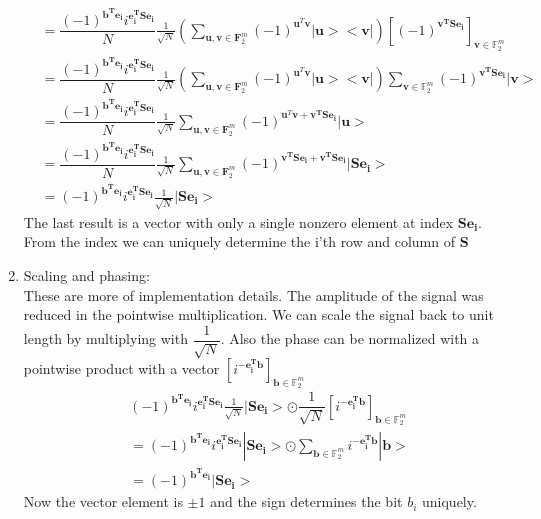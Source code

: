 \documentclass{article}
\begin{document}
\begin{enumerate}
\begin{align*}
		&= \dfrac{(-1)^{\mathbf{b^Te_i}}i^{\mathbf{e_i^TSe_i}}}{N} \frac{1}{\sqrt{N}} \left(\sum_{\mathbf{u}, \mathbf{v} \in \mathbf{F}_2^m}{\left(-1\right)^{\mathbf{u}^T \mathbf{v} } |\mathbf{u}><\mathbf{v}|}\right)  \left[(-1)^{\mathbf{v^TSe_i}}\right]_{\mathbf{v} \in \mathbb{F}_2^m} \\
		&=  \dfrac{(-1)^{\mathbf{b^Te_i}}i^{\mathbf{e_i^TSe_i}}}{N} \frac{1}{\sqrt{N}} \left(\sum_{\mathbf{u}, \mathbf{v} \in \mathbf{F}_2^m}{\left(-1\right)^{\mathbf{u}^T \mathbf{v} } |\mathbf{u}><\mathbf{v}|}\right) \sum_{\mathbf{v} \in \mathbb{F}_2^m} (-1)^{\mathbf{v^TSe_i}} |\mathbf{v}> \\
		&= \dfrac{(-1)^{\mathbf{b^Te_i}}i^{\mathbf{e_i^TSe_i}}}{N} \frac{1}{\sqrt{N}} \sum_{\mathbf{u}, \mathbf{v} \in \mathbf{F}_2^m}{\left(-1\right)^{\mathbf{u}^T \mathbf{v} + \mathbf{v^TSe_i}} |\mathbf{u}>} \\
		&= \dfrac{(-1)^{\mathbf{b^Te_i}}i^{\mathbf{e_i^TSe_i}}}{N} \frac{1}{\sqrt{N}} \sum_{\mathbf{u}, \mathbf{v} \in \mathbf{F}_2^m}{\left(-1\right)^{\mathbf{v^TSe_i} + \mathbf{v^TSe_i}} |\mathbf{Se_i}>} \\
		&= (-1)^{\mathbf{b^Te_i}}i^{\mathbf{e_i^TSe_i}} \frac{1}{\sqrt{N}} |\mathbf{Se_i} >
	\end{align*}
	The last result is a vector with only a single nonzero element at index $\mathbf{Se_i}$. From the index we can uniquely determine the i'th row and column of $\mathbf{S}$
	\item Scaling and phasing: \\
	These are more of implementation details. The amplitude of the signal was reduced in the pointwise multiplication. We can scale the signal back to unit length by multiplying with $\dfrac{1}{\sqrt{N}}$. Also the phase can be normalized with a pointwise product with a vector $\left[i^{\mathbf{-e_i^Tb}}\right]_{\mathbf{b} \in \mathbb{F}_2^m}$
	\begin{align*}
		&(-1)^{\mathbf{b^Te_i}}i^{\mathbf{e_i^TSe_i}} \frac{1}{\sqrt{N}} |\mathbf{Se_i} > \odot \dfrac{1}{\sqrt{N}} \left[i^{\mathbf{-e_i^Tb}}\right]_{\mathbf{b} \in \mathbb{F}_2^m} \\
		&= (-1)^{\mathbf{b^Te_i}}i^{\mathbf{e_i^TSe_i}} |\mathbf{Se_i} >\odot \sum_{\mathbf{b} \in \mathbb{F}_2^m} i^{\mathbf{-e_i^Tb}} | \mathbf{b} > \\
		&= (-1)^{\mathbf{b^Te_i}} |\mathbf{Se_i} >
	\end{align*}
	Now the vector element is $\pm 1$ and the sign determines the bit $b_i$ uniquely.
\end{enumerate}
\end{document}
